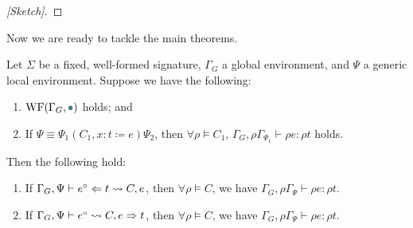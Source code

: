\begin{proof}[{[Sketch]}]
\end{proof}
\fi

Now we are ready to tackle the main theorems.

\begin{theorem}\label{thm:soundness}
Let $\Sigma$ be a fixed, well-formed signature, $\Gamma_G$ a global environment, and $\Psi$ a generic local environment.
Suppose we have the following:
\begin{enumerate}[label=\roman*.]
  \item \label{item:sound:wf:global} $\WF{\Gamma_G, \mt}$ holds; and
  \item \label{item:sound:psi} If $\Psi \equiv \Psi_1 (C_1, x : t \coloneqq e) \Psi_2$, then
    $\forall \rho \vDash C_1$, $\Gamma_G, \rho \Gamma_{\Psi_1} \vdash \rho e : \rho t$ holds.
\end{enumerate}
Then the following hold:
\begin{enumerate}
  \item If $\Gamma_G, \Psi \vdash e^\circ \Leftarrow t \rightsquigarrow C, e$,
  then $\forall \rho \vDash C$, we have $\Gamma_G, \rho\Gamma_\Psi \vdash \rho e : \rho t$.
  \item If $\Gamma_G, \Psi \vdash e^\circ \rightsquigarrow C, e \Rightarrow t$,
  then $\forall \rho \vDash C$, we have $\Gamma_G, \rho\Gamma_\Psi \vdash \rho e : \rho t$.
\end{enumerate}
\end{theorem}

